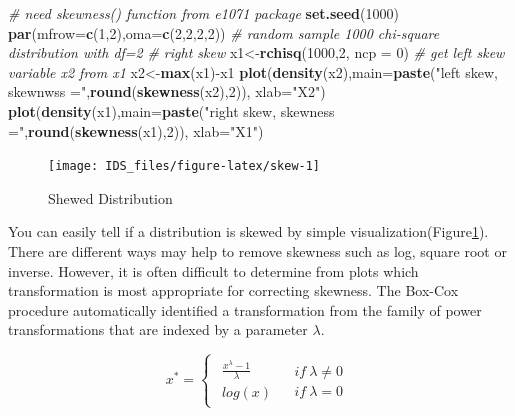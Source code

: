 \documentclass[12pt,]{krantz}
\newenvironment{Shaded}{\begin{snugshade}}{\end{snugshade}}
\newcommand{\KeywordTok}[1]{\textcolor[rgb]{0.13,0.29,0.53}{\textbf{{#1}}}}
\newcommand{\DataTypeTok}[1]{\textcolor[rgb]{0.13,0.29,0.53}{{#1}}}
\newcommand{\DecValTok}[1]{\textcolor[rgb]{0.00,0.00,0.81}{{#1}}}
\newcommand{\StringTok}[1]{\textcolor[rgb]{0.31,0.60,0.02}{{#1}}}
\newcommand{\CommentTok}[1]{\textcolor[rgb]{0.56,0.35,0.01}{\textit{{#1}}}}
\newcommand{\NormalTok}[1]{{#1}}
\theoremstyle{definition}
\theoremstyle{definition}
\theoremstyle{remark}
\begin{document}
\begin{Shaded}
\begin{Highlighting}[]
\CommentTok{# need skewness() function from e1071 package}
\KeywordTok{set.seed}\NormalTok{(}\DecValTok{1000}\NormalTok{)}
\KeywordTok{par}\NormalTok{(}\DataTypeTok{mfrow=}\KeywordTok{c}\NormalTok{(}\DecValTok{1}\NormalTok{,}\DecValTok{2}\NormalTok{),}\DataTypeTok{oma=}\KeywordTok{c}\NormalTok{(}\DecValTok{2}\NormalTok{,}\DecValTok{2}\NormalTok{,}\DecValTok{2}\NormalTok{,}\DecValTok{2}\NormalTok{))}
\CommentTok{# random sample 1000 chi-square distribution with df=2}
\CommentTok{# right skew}
\NormalTok{x1<-}\KeywordTok{rchisq}\NormalTok{(}\DecValTok{1000}\NormalTok{,}\DecValTok{2}\NormalTok{, }\DataTypeTok{ncp =} \DecValTok{0}\NormalTok{)}
\CommentTok{# get left skew variable x2 from x1}
\NormalTok{x2<-}\KeywordTok{max}\NormalTok{(x1)-x1}
\KeywordTok{plot}\NormalTok{(}\KeywordTok{density}\NormalTok{(x2),}\DataTypeTok{main=}\KeywordTok{paste}\NormalTok{(}\StringTok{"left skew, skewnwss ="}\NormalTok{,}\KeywordTok{round}\NormalTok{(}\KeywordTok{skewness}\NormalTok{(x2),}\DecValTok{2}\NormalTok{)), }\DataTypeTok{xlab=}\StringTok{"X2"}\NormalTok{)}
\KeywordTok{plot}\NormalTok{(}\KeywordTok{density}\NormalTok{(x1),}\DataTypeTok{main=}\KeywordTok{paste}\NormalTok{(}\StringTok{"right skew, skewness ="}\NormalTok{,}\KeywordTok{round}\NormalTok{(}\KeywordTok{skewness}\NormalTok{(x1),}\DecValTok{2}\NormalTok{)), }\DataTypeTok{xlab=}\StringTok{"X1"}\NormalTok{)}
\end{Highlighting}
\end{Shaded}

\begin{figure}

{\centering \texttt{[image: IDS\_files/figure-latex/skew-1]} 

}

\caption{Shewed Distribution}\label{fig:skew}
\end{figure}

You can easily tell if a distribution is skewed by simple
visualization(Figure\ref{fig:skew}). There are different ways may help
to remove skewness such as log, square root or inverse. However, it is
often difficult to determine from plots which transformation is most
appropriate for correcting skewness. The Box-Cox procedure automatically
identified a transformation from the family of power transformations
that are indexed by a parameter \(\lambda\)\citep{BOXCOX1}.

\[
x^{*}=\begin{cases}
\begin{array}{c}
\frac{x^{\lambda}-1}{\lambda}\\
log(x)
\end{array} & \begin{array}{c}
if\ \lambda\neq0\\
if\ \lambda=0
\end{array}\end{cases}
\]
\end{document}
